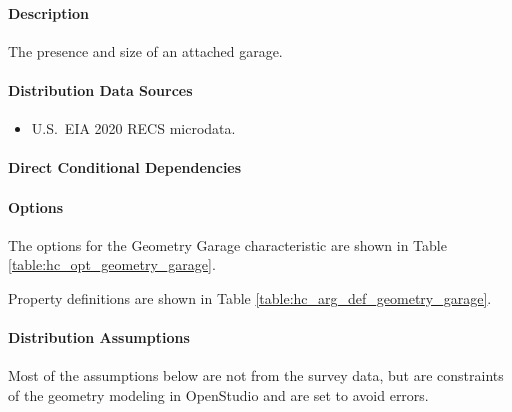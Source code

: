 \paragraph{Description}
% 
The presence and size of an attached garage.

\paragraph{Distribution Data Sources}
% 
\begin{itemize}
    \item U.S.~EIA 2020 RECS microdata.
\end{itemize}

\paragraph{Direct Conditional Dependencies}


\paragraph{Options}
The options for the Geometry Garage characteristic are shown in Table \ref{table:hc_opt_geometry_garage}.



Property definitions are shown in Table \ref{table:hc_arg_def_geometry_garage}.



\paragraph{Distribution Assumptions}
% 
Most of the assumptions below are not from the survey data, but are constraints of the geometry modeling in OpenStudio and are set to avoid errors.

